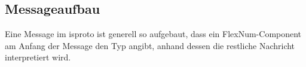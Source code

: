 

\subsection{Messageaufbau}
Eine Message im \gls{isproto} ist generell so aufgebaut, dass ein FlexNum-Component am Anfang der
Message den Typ angibt, anhand dessen die restliche Nachricht interpretiert wird.

\isgeneralbytefield

